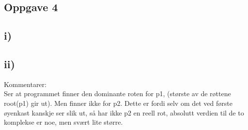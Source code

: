 \documentclass[a4paper, norsk, twoside, 10pt]{article}
\begin{document}
\begin{flushleft}
\newpage
  \section*{Oppgave 4}
  \subsection*{i)}

  
\newpage
  \subsection*{ii)}

  
\newpage

  Kommentarer: \\
  Ser at programmet finner den dominante roten for p1, (største av de røttene root(p1) gir ut). Men finner ikke for p2. Dette er fordi selv om det ved første øyenkast kanskje ser slik ut, så har ikke p2 en reell rot, absolutt verdien til de to komplekse er noe, men svært lite større.
\end{flushleft}
\end{document}
